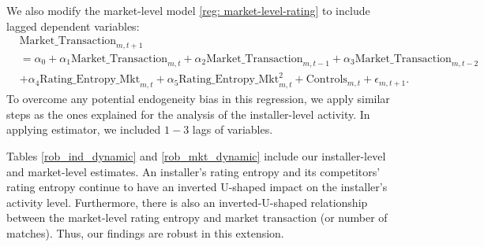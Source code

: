 \documentclass[msom,blindrev]{informs3}
\begin{document}
We also modify the market-level model \eqref{reg: market-level-rating} to include lagged dependent variables:
\begin{align} \nonumber
&\text{Market\_Transaction}_{m,t+1}\\ \nonumber
& =\alpha_{0}+ \alpha_{1} \text{Market\_Transaction}_{m,t}+ \alpha_{2} \text{Market\_Transaction}_{m,t-1} + \alpha_{3} \text{Market\_Transaction}_{m,t-2} \\ \label{eq: ext_market_level}
&+ \alpha_{4} \text{Rating\_Entropy\_Mkt}_{m,t}+ \alpha_{5}\text{Rating\_Entropy\_Mkt}_{m,t} ^2 + \text{Controls}_{m,t}  +\epsilon_{m,t+1}.
\end{align}
To overcome any potential endogeneity bias in this regression, we apply similar steps as the ones explained for the analysis of the installer-level activity. In applying  \cite{arellano1991some} estimator, we included $1-3$ lags of variables.  

Tables \ref{rob_ind_dynamic} and \ref{rob_mkt_dynamic} include our installer-level and market-level estimates. An installer's rating entropy and its competitors' rating entropy continue to have an inverted U-shaped impact on the installer's activity level. Furthermore, there is also an inverted-U-shaped relationship between the market-level rating entropy and market transaction (or number of matches).  Thus, our findings are robust in this extension.



\end{document}
